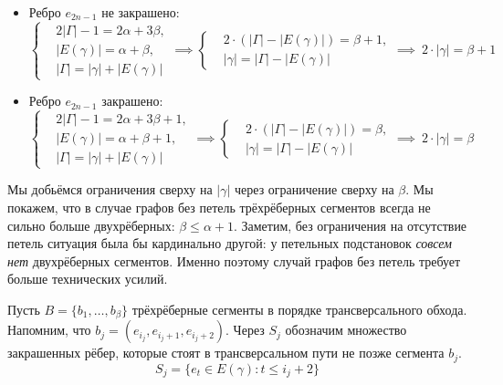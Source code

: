 \documentclass{article}
\theoremstyle{definition}
\begin{document}
\begin{itemize}
    \item Ребро $e_{2n - 1}$ не закрашено:
    \[
    \left\{
    \begin{aligned}
        & 2|\Gamma| - 1 = 2\alpha + 3\beta, \\
        & |E(\gamma)| = \alpha + \beta, \\
        & |\Gamma| = |\gamma| + |E(\gamma)|
    \end{aligned} 
    \right. 
    \implies{
        \left\{
        \begin{aligned}
            & 2\cdot (|\Gamma| - |E(\gamma)|) = \beta + 1, \\
            & |\gamma|= |\Gamma| - |E(\gamma)|
        \end{aligned} 
        \right. 
        \implies
        \ 2\cdot|\gamma| = \beta + 1
    }
    \]
    \item Ребро $e_{2n - 1}$ закрашено:
    \[
    \left\{
    \begin{aligned}
        & 2|\Gamma| - 1 = 2\alpha + 3\beta + 1, \\
        & |E(\gamma)| = \alpha + \beta + 1, \\
        & |\Gamma| = |\gamma| + |E(\gamma)|
    \end{aligned} 
    \right.
    \implies{
        \left\{
        \begin{aligned}
            & 2\cdot (|\Gamma| - |E(\gamma)|) = \beta, \\
            & |\gamma|= |\Gamma| - |E(\gamma)|
        \end{aligned} 
        \right. 
        \implies
        \ 2\cdot|\gamma| = \beta
    }
    \]
\end{itemize}

Мы добьёмся ограничения сверху на $|\gamma|$ через ограничение сверху на $\beta$. Мы покажем, что в случае графов без петель трёхрёберных сегментов всегда не сильно больше двухрёберных: $\beta \leq \alpha + 1$. Заметим, без ограничения на отсутствие петель ситуация была бы кардинально другой: у петельных подстановок \emph{совсем нет} двухрёберных сегментов. Именно поэтому случай графов без петель требует больше технических усилий.

Пусть $B = \{b_1, \dots, b_{\beta}\}$ трёхрёберные сегменты в порядке трансверсального обхода. Напомним, что $b_j = (e_{i_j}, e_{i_j + 1}, e_{i_j + 2})$. 
Через $S_j$ обозначим множество закрашенных рёбер, которые стоят в трансверсальном пути не позже сегмента $b_j$.
\[
    S_j = \{e_t \in E(\gamma) : t \leq i_j + 2\}
\]
\end{document}
